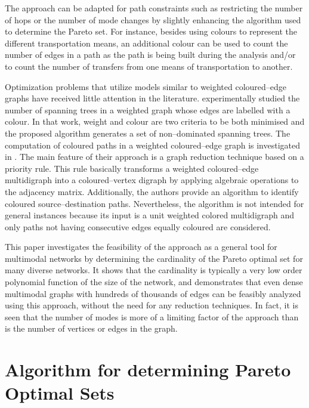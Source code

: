 \documentclass[preprint,authoryear,12pt]{elsarticle}
\begin{document}
The approach can be adapted for path constraints
such as restricting the number of hops or the number of mode changes by
slightly enhancing the algorithm used to determine the Pareto set.
For instance, besides using colours to represent the different transportation means,
an additional colour can be used to count the number of edges in a path
as the path is being built during the analysis
and/or to count the number of transfers from one means of transportation to another.

Optimization problems that utilize models similar to weighted coloured--edge graphs
have received little attention in the literature. \cite{Climaco2010} experimentally
studied the number of spanning trees in a weighted graph whose edges are labelled
with a colour. In that work, weight and colour are two criteria to be both minimised
and the proposed algorithm generates a set of non--dominated spanning trees.
The computation of coloured paths in a weighted coloured--edge graph is investigated
in \cite{Xu2009}. The main feature of their approach is a graph reduction technique
based on a priority rule. This rule basically transforms a weighted coloured--edge
multidigraph into a coloured--vertex digraph by applying algebraic operations to the
adjacency matrix. Additionally, the authors provide an algorithm to identify coloured
source--destination paths. Nevertheless, the algorithm is not intended
for general instances because its input is a unit weighted colored multidigraph and only
paths not having consecutive edges equally coloured are considered.

This paper investigates the feasibility of the approach as a general tool for
multimodal networks by determining the cardinality of the Pareto optimal set
 for many diverse networks.
It shows that the cardinality is typically a very low order polynomial function
of the size of the network, and demonstrates that even dense multimodal graphs
with hundreds of thousands of edges can be feasibly analyzed using this approach,
without the need for any reduction techniques.
In fact, it is seen that the number of modes  is more of a limiting
factor of the approach than is the number of vertices or edges in the graph.

\section{Algorithm for determining Pareto Optimal Sets}\label{Se:Algorithm}
\end{document}
